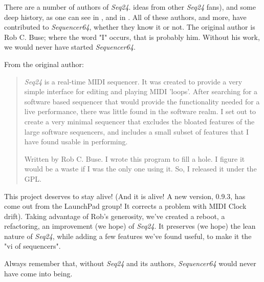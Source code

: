    There are a number of authors of \textsl{Seq24}.
   ideas from other \textsl{Seq24} fans),
   and some deep history,
   as one can see in ,
   and in .
   All of these authors, and more, have contributed to \textsl{Sequencer64},
   whether they know it or not.
   The original author is Rob C. Buse; where the word "I" occurs, that is
   probably him.  Without his work, we would never have started
   \textsl{Sequencer64}.

   From the original author:

   \begin{quotation}
      \textsl{Seq24} is a real-time MIDI sequencer. It was created to
      provide a very simple interface for editing and playing MIDI 'loops'.
      After searching for a software based sequencer that would provide the
      functionality needed for a live performance, there was little found in
      the software realm. I set out to create a very minimal sequencer that
      excludes the bloated features of the large software sequencers, and
      includes a small subset of features that I have found usable in
      performing. 

      Written by Rob C. Buse.  I wrote this program to fill a
      hole.  I figure it would be a waste if I was the only one
      using it.  So, I released it under the GPL.
   \end{quotation}

   This project deserves to stay alive!
   (And it is alive!  A new version, 0.9.3, has come out from the LaunchPad
   group!  It corrects a problem with MIDI Clock drift).
   Taking advantage of Rob's generosity,
   we've created a reboot, a refactoring, an improvement (we hope) of
   \textsl{Seq24}.  It preserves (we hope) the lean nature of \textsl{Seq24},
   while adding a few features we've found useful, to make it the
    "vi of sequencers".
   
   Always remember that, without \textsl{Seq24} and its authors,
   \textsl{Sequencer64} would never have come into being.

